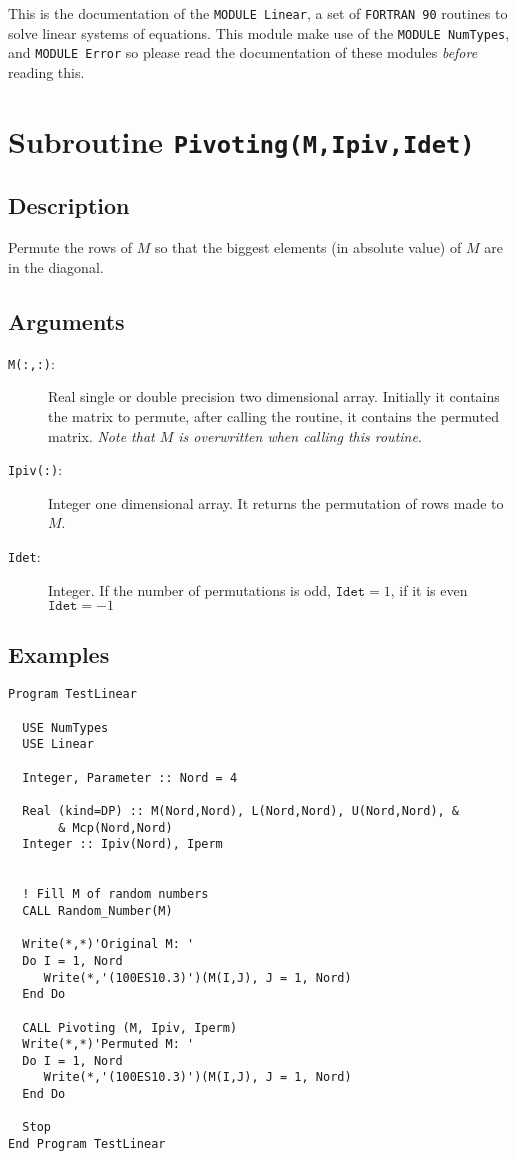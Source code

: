 This is the documentation of the \texttt{MODULE Linear}, a set
of \texttt{FORTRAN 90} routines to solve linear systems of
equations. This module make use of the \texttt{MODULE NumTypes},
and \texttt{MODULE Error} so please read the
documentation of these modules \emph{before} reading this.


\section{Subroutine \texttt{Pivoting(M,Ipiv,Idet)}}

\subsection{Description}

Permute the rows of $M$ so that the biggest elements (in absolute
value) of $M$ are in the diagonal.

\subsection{Arguments}

\begin{description}
\item[\texttt{M(:,:)}: ] Real single or double precision two dimensional
  array. Initially it contains the matrix to permute, after calling
  the routine, it contains the permuted matrix. \emph{Note that $M$ is
    overwritten when calling this routine}. 
\item[\texttt{Ipiv(:)}: ] Integer one dimensional array. It returns
  the permutation of rows made to $M$.
\item[\texttt{Idet}: ] Integer. If the number of permutations is odd,
  $\mathtt{Idet}=1$, if it is even $\mathtt{Idet}=-1$
\end{description}

\subsection{Examples}

\begin{lstlisting}[emph=Pivoting,
                   emphstyle=\color{blue},
                   frame=trBL,
                   caption=Pivoting data of a matrix
                   label=pivoting]
Program TestLinear

  USE NumTypes
  USE Linear

  Integer, Parameter :: Nord = 4

  Real (kind=DP) :: M(Nord,Nord), L(Nord,Nord), U(Nord,Nord), &
       & Mcp(Nord,Nord)
  Integer :: Ipiv(Nord), Iperm


  ! Fill M of random numbers
  CALL Random_Number(M)

  Write(*,*)'Original M: '
  Do I = 1, Nord
     Write(*,'(100ES10.3)')(M(I,J), J = 1, Nord)
  End Do

  CALL Pivoting (M, Ipiv, Iperm)
  Write(*,*)'Permuted M: '
  Do I = 1, Nord
     Write(*,'(100ES10.3)')(M(I,J), J = 1, Nord)
  End Do

  Stop
End Program TestLinear
\end{lstlisting}


